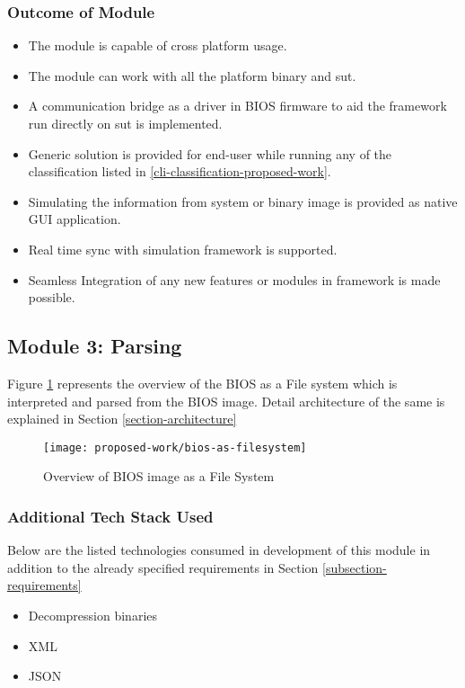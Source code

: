 \subsubsection{Outcome of Module}
\begin{itemize}
	\item The module is capable of cross platform usage.
	\item The module can work with all the platform binary and \gls{sut}.
	\item A communication bridge as a driver in BIOS firmware to aid the framework run directly on \gls{sut} is implemented.
	\item Generic solution is provided for end-user while running any of the classification listed in \ref{cli-classification-proposed-work}.
	\item Simulating the information from system or binary image is provided as native GUI application.
	\item Real time sync with simulation framework is supported.
	\item Seamless Integration of any new features or modules in framework is made possible.
\end{itemize}

\subsection{Module 3: Parsing}\label{module-parsing}
Figure \ref{fig:bios-as-filesystem} represents the overview of the BIOS as a File system  which is interpreted and parsed from the BIOS image. Detail architecture of the same is explained in Section \ref{section-architecture}

\begin{figure}[!htbp]
	\centering
	\texttt{[image: proposed-work/bios-as-filesystem]}
	\caption{Overview of BIOS image as a File System}\label{fig:bios-as-filesystem}
\end{figure}

\subsubsection{Additional Tech Stack Used}
Below are the listed technologies consumed in development of this module in addition to the already specified requirements in Section \ref{subsection-requirements}
\begin{itemize}
	\item Decompression binaries
	\item XML
	\item JSON
\end{itemize}

